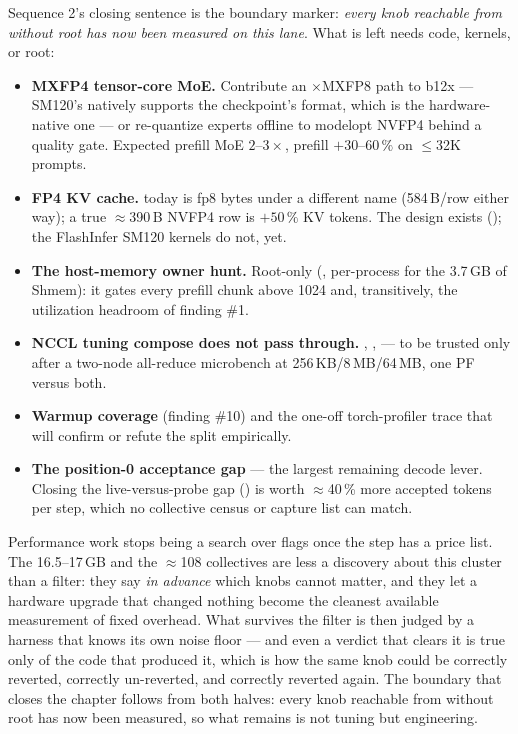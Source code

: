 Sequence 2's closing sentence is the boundary marker: \emph{every knob
reachable from  without root has now been measured on
this lane}. What is left needs code, kernels, or root:

\begin{itemize}
  \item \textbf{MXFP4 tensor-core MoE.} Contribute an
    $\times$MXFP8 path to b12x --- SM120's
      natively supports the checkpoint's format,
    which is the hardware-native one --- or re-quantize experts offline to
    modelopt NVFP4 behind a quality gate. Expected prefill MoE $2$--$3\times$,
    prefill $+30$--$60\,\%$ on $\leq$32K prompts.
  \item \textbf{FP4 KV cache.}  today is fp8 bytes under a
    different name (584\,B/row either way); a true $\approx$390\,B NVFP4 row is
    $+50\,\%$ KV tokens. The design exists
    (); the FlashInfer SM120
    kernels do not, yet.
  \item \textbf{The host-memory owner hunt.} Root-only (,
    per-process  for the 3.7\,GB of Shmem): it gates every prefill
    chunk above 1024 and, transitively, the utilization headroom of finding \#1.
  \item \textbf{NCCL tuning compose does not pass through.}
    , ,
     --- to be trusted only after a two-node all-reduce
    microbench at 256\,KB/8\,MB/64\,MB, one PF versus both.
  \item \textbf{Warmup coverage} (finding \#10) and the one-off torch-profiler
    trace that will confirm or refute the  split
    empirically.
  \item \textbf{The position-0 acceptance gap} --- the largest remaining decode
    lever. Closing the live-versus-probe gap () is worth
    $\approx$40\,\% more accepted tokens per step, which no collective
    census or capture list can match.
\end{itemize}

Performance work stops being a search over flags once the step has a price
list. The 16.5--17\,GB and the $\approx$108 collectives are less a discovery
about this cluster than a filter: they say \emph{in advance} which knobs
cannot matter, and they let a hardware upgrade that changed nothing become
the cleanest available measurement of fixed overhead. What survives the
filter is then judged by a harness that knows its own noise floor --- and
even a verdict that clears it is true only of the code that produced it,
which is how the same knob could be correctly reverted, correctly
un-reverted, and correctly reverted again. The boundary that
closes the chapter follows from both halves: every knob reachable from
 without root has now been measured, so what remains is
not tuning but engineering.

